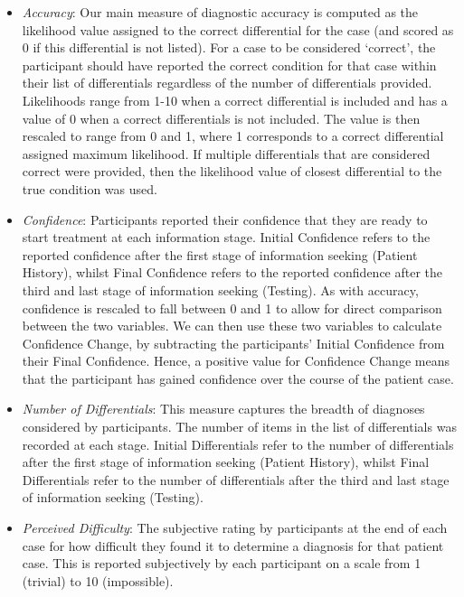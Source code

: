 \documentclass[a4paper, nobind]{templates/ociamthesis}
\begin{document}
\begin{itemize}
\item
  \emph{Accuracy}: Our main measure of diagnostic accuracy is computed as the likelihood value assigned to the correct differential for the case (and scored as 0 if this differential is not listed). For a case to be considered `correct', the participant should have reported the correct condition for that case within their list of differentials regardless of the number of differentials provided. Likelihoods range from 1-10 when a correct differential is included and has a value of 0 when a correct differentials is not included. The value is then rescaled to range from 0 and 1, where 1 corresponds to a correct differential assigned maximum likelihood. If multiple differentials that are considered correct were provided, then the likelihood value of closest differential to the true condition was used.
\item
  \emph{Confidence}: Participants reported their confidence that they are ready to start treatment at each information stage. Initial Confidence refers to the reported confidence after the first stage of information seeking (Patient History), whilst Final Confidence refers to the reported confidence after the third and last stage of information seeking (Testing). As with accuracy, confidence is rescaled to fall between 0 and 1 to allow for direct comparison between the two variables. We can then use these two variables to calculate Confidence Change, by subtracting the participants' Initial Confidence from their Final Confidence. Hence, a positive value for Confidence Change means that the participant has gained confidence over the course of the patient case.
\item
  \emph{Number of Differentials}: This measure captures the breadth of diagnoses considered by participants. The number of items in the list of differentials was recorded at each stage. Initial Differentials refer to the number of differentials after the first stage of information seeking (Patient History), whilst Final Differentials refer to the number of differentials after the third and last stage of information seeking (Testing).
\item
  \emph{Perceived Difficulty}: The subjective rating by participants at the end of each case for how difficult they found it to determine a diagnosis for that patient case. This is reported subjectively by each participant on a scale from 1 (trivial) to 10 (impossible).
\end{itemize}
\end{document}
